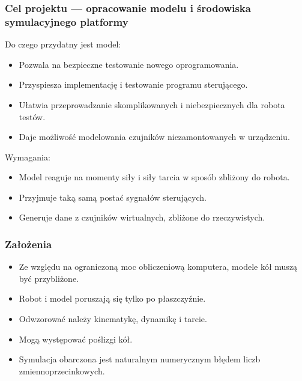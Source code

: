 \documentclass{beamer}
\begin{document}
	\begin{frame}
		\frametitle{Cel projektu --- opracowanie modelu i środowiska symulacyjnego platformy}
		Do czego przydatny jest model:
		\begin{itemize}
			\item Pozwala na bezpieczne testowanie nowego oprogramowania.
			\item Przyspiesza implementację i testowanie programu sterującego.
			\item Ułatwia przeprowadzanie skomplikowanych i niebezpiecznych dla robota testów.
			\item Daje możliwość modelowania czujników niezamontowanych w urządzeniu.
		\end{itemize}
		Wymagania:
		\begin{itemize}
			\item Model reaguje na momenty siły i siły tarcia w sposób zbliżony do robota.
			\item Przyjmuje taką samą postać sygnałów sterujących.
			\item Generuje dane z czujników wirtualnych, zbliżone do rzeczywistych.
		\end{itemize}
	\end{frame}
	
	\begin{frame}
		\frametitle{Założenia}
		\begin{itemize}
			\item Ze względu na ograniczoną moc obliczeniową komputera, modele kół muszą być przybliżone.
			\item Robot i model poruszają się tylko po płaszczyźnie.
			\item Odwzorować należy kinematykę, dynamikę i tarcie.
			\item Mogą występować poślizgi kół.
			\item Symulacja obarczona jest naturalnym numerycznym błędem liczb zmiennoprzecinkowych.
		\end{itemize}
	\end{frame}

	
\end{document}
